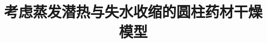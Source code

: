 \documentclass[12pt,a4paper]{ctexart}
\title{考虑蒸发潜热与失水收缩的圆柱药材干燥模型}
\author{}
\date{}
\begin{document}


\maketitle

\begin{abstract}

\end{abstract}

\newpage




\setcounter{table}{0}








\clearpage
\appendix

\end{document}
